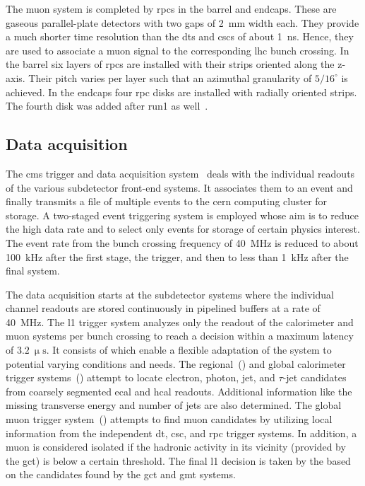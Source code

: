 The muon system is completed by \glspl{rpc} in the barrel and endcaps. These are gaseous parallel-plate detectors with two gaps of 2~mm width each. They provide a much shorter time resolution than the \glspl{dt} and \glspl{csc} of about 1~ns. Hence, they are used to associate a muon signal to the corresponding \gls{lhc} bunch crossing. In the barrel six layers of \glspl{rpc} are installed with their strips oriented along the z-axis. Their pitch varies per layer such that an azimuthal granularity of $5/16^\circ$ is achieved. In the endcaps four \gls{rpc} disks are installed with radially oriented strips. The fourth disk was added after \gls{run1} as well~\cite{Tytgat:2012xi}.



\subsection{Data acquisition}


The \gls{cms} trigger and data acquisition system~\cite{Cittolin:578006,Bawej:2015tmz} deals with the individual readouts of the various subdetector front-end systems. It associates them to an event and finally transmits a file of multiple events to the \gls{cern} computing cluster for storage. A two-staged event triggering system is employed whose aim is to reduce the high data rate and to select only events for storage of certain physics interest. The event rate from the bunch crossing frequency of 40~MHz is reduced to about 100~kHz after the first stage, the  trigger, and then to less than 1~kHz after the final  system.

The data acquisition starts at the subdetector systems where the individual channel readouts are stored continuously in pipelined buffers at a rate of 40~MHz. The \gls{l1} trigger system analyzes only the readout of the calorimeter and muon systems per bunch crossing to reach a decision within a maximum latency of $3.2~\upmu\mathrm{s}$. It consists of  which enable a flexible adaptation of the system to potential varying conditions and needs. The regional~() and global calorimeter trigger systems~() attempt to locate electron, photon, jet, and $\tau$-jet candidates from coarsely segmented \gls{ecal} and \gls{hcal} readouts. Additional information like the missing transverse energy and number of jets are also determined. The global muon trigger system~() attempts to find muon candidates by utilizing local information from the independent \gls{dt}, \gls{csc}, and \gls{rpc} trigger systems. In addition, a muon is considered isolated if the hadronic activity in its vicinity (provided by the \gls{gct}) is below a certain threshold. The final \gls{l1} decision is taken by the  based on the candidates found by the \gls{gct} and \gls{gmt} systems.


